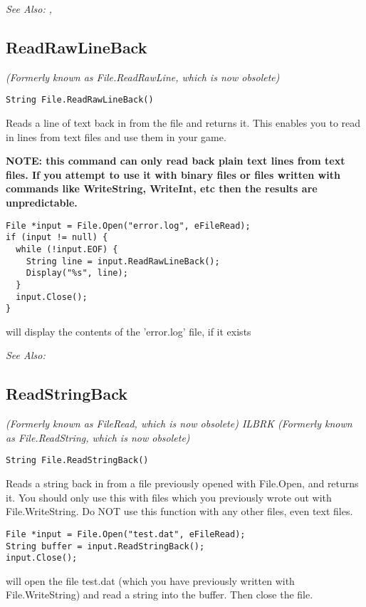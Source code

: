 \it{See Also:} , 


\subsection{ReadRawLineBack}\label{File.ReadRawLineBack}%

\it{(Formerly known as File.ReadRawLine, which is now obsolete)}

\begin{verbatim}
String File.ReadRawLineBack()
\end{verbatim}
Reads a line of text back in from the file and returns it. This enables you to
read in lines from text files and use them in your game.

\bf{NOTE:} this command can only read back plain text lines from text files. If you
attempt to use it with binary files or files written with commands like WriteString,
WriteInt, etc then the results are unpredictable.

\begin{verbatim}
File *input = File.Open("error.log", eFileRead);
if (input != null) {
  while (!input.EOF) {
    String line = input.ReadRawLineBack();
    Display("%s", line);
  }
  input.Close();
}
\end{verbatim}
will display the contents of the 'error.log' file, if it exists

\it{See Also:} 


\subsection{ReadStringBack}\label{File.ReadStringBack}%

\it{(Formerly known as FileRead, which is now obsolete)} ILBRK
\it{(Formerly known as File.ReadString, which is now obsolete)}

\begin{verbatim}
String File.ReadStringBack()
\end{verbatim}
Reads a string back in from a file previously opened with File.Open, and returns it.
You should only use this with files which you previously wrote out with
File.WriteString. Do NOT use this function with any other files, even text files.

\begin{verbatim}
File *input = File.Open("test.dat", eFileRead);
String buffer = input.ReadStringBack();
input.Close();
\end{verbatim}
will open the file test.dat (which you have previously written with File.WriteString) and
read a string into the buffer. Then close the file.

